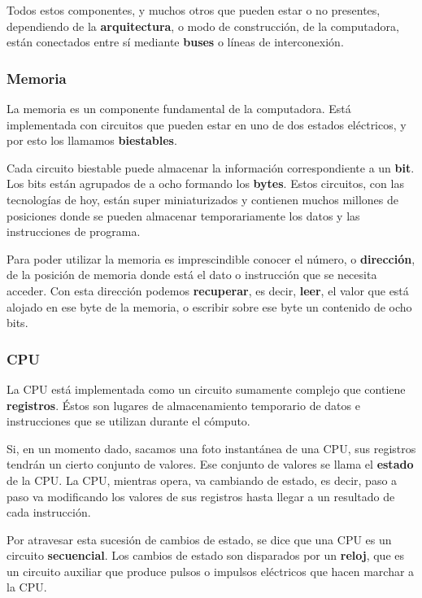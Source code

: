 \documentclass[spanish,a4paper,]{article}
\begin{document}
Todos estos componentes, y muchos otros que pueden estar o no presentes,
dependiendo de la \textbf{arquitectura}, o modo de construcción, de la
computadora, están conectados entre sí mediante \textbf{buses} o líneas
de interconexión.

\hypertarget{memoria}{%
\subsubsection{Memoria}\label{memoria}}

La memoria es un componente fundamental de la computadora. Está
implementada con circuitos que pueden estar en uno de dos estados
eléctricos, y por esto los llamamos \textbf{biestables}.

Cada circuito biestable puede almacenar la información correspondiente a
un \textbf{bit}. Los bits están agrupados de a ocho formando los
\textbf{bytes}. Estos circuitos, con las tecnologías de hoy, están super
miniaturizados y contienen muchos millones de posiciones donde se pueden
almacenar temporariamente los datos y las instrucciones de programa.

Para poder utilizar la memoria es imprescindible conocer el número, o
\textbf{dirección}, de la posición de memoria donde está el dato o
instrucción que se necesita acceder. Con esta dirección podemos
\textbf{recuperar}, es decir, \textbf{leer}, el valor que está alojado
en ese byte de la memoria, o escribir sobre ese byte un contenido de
ocho bits.

\hypertarget{cpu}{%
\subsubsection{CPU}\label{cpu}}

La CPU está implementada como un circuito sumamente complejo que
contiene \textbf{registros}. Éstos son lugares de almacenamiento
temporario de datos e instrucciones que se utilizan durante el cómputo.

Si, en un momento dado, sacamos una foto instantánea de una CPU, sus
registros tendrán un cierto conjunto de valores. Ese conjunto de valores
se llama el \textbf{estado} de la CPU. La CPU, mientras opera, va
cambiando de estado, es decir, paso a paso va modificando los valores de
sus registros hasta llegar a un resultado de cada instrucción.

Por atravesar esta sucesión de cambios de estado, se dice que una CPU es
un circuito \textbf{secuencial}. Los cambios de estado son disparados
por un \textbf{reloj}, que es un circuito auxiliar que produce pulsos o
impulsos eléctricos que hacen marchar a la CPU.
\end{document}
